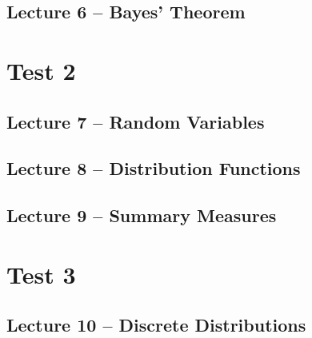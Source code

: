 \documentclass{article}
\begin{document}
\subsection{Lecture 6 -- Bayes' Theorem}
\newpage

\section{Test 2}

\secttoc

\subsection{Lecture 7 -- Random Variables}
\newpage

\subsection{Lecture 8 -- Distribution Functions}
\newpage

\subsection{Lecture 9 -- Summary Measures}
\newpage

\section{Test 3}

\secttoc

\subsection{Lecture 10 -- Discrete Distributions}
\newpage
\end{document}
